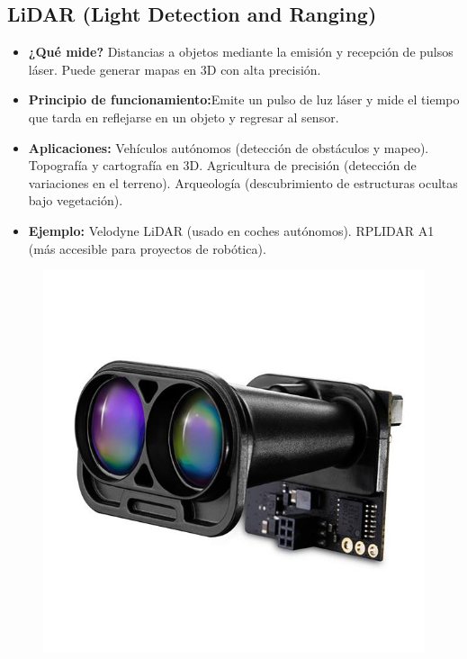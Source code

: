 \subsection*{LiDAR (Light Detection and Ranging)}
\begin{itemize}
	\item \textbf{¿Qué mide?} Distancias a objetos mediante la emisión y recepción de pulsos láser.
	Puede generar mapas en 3D con alta precisión.
	\item \textbf{Principio de funcionamiento:}Emite un pulso de luz láser y mide el tiempo que tarda en reflejarse en un objeto y regresar al sensor.
	\item \textbf{Aplicaciones:} Vehículos autónomos (detección de obstáculos y mapeo).
	Topografía y cartografía en 3D.
	Agricultura de precisión (detección de variaciones en el terreno).
	Arqueología (descubrimiento de estructuras ocultas bajo vegetación).
	\item \textbf{Ejemplo:} Velodyne LiDAR (usado en coches autónomos).
	RPLIDAR A1 (más accesible para proyectos de robótica).
\end{itemize}
\begin{figure}[h]
	\centering
	\includegraphics[width=0.3\linewidth]{img/LiDAR}
	\label{fig:LiDAR}
\end{figure}